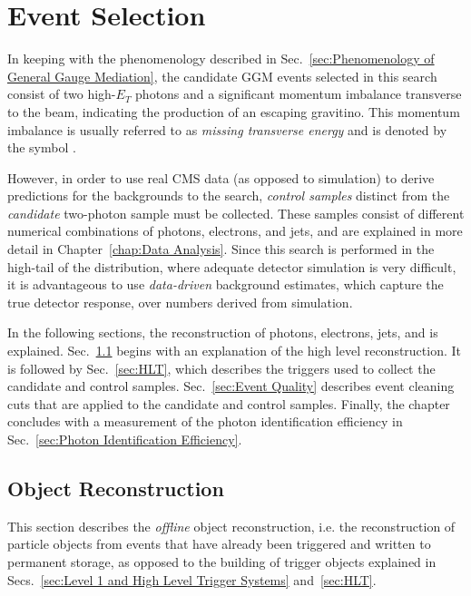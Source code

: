 \documentclass[dissertation.tex]{subfiles}
\begin{document}
\chapter{Event Selection}
\label{chap:Event Selection}

In keeping with the phenomenology described in Sec.~\ref{sec:Phenomenology of General Gauge Mediation}, the candidate GGM events selected in this search consist of two high-$E_{T}$ photons and a significant momentum imbalance transverse to the beam, indicating the production of an escaping gravitino.  This momentum imbalance is usually referred to as \textit{missing transverse energy} and is denoted by the symbol \MET.

However, in order to use real CMS data (as opposed to simulation) to derive predictions for the backgrounds to the search, \textit{control samples} distinct from the \textit{candidate} two-photon sample must be collected.  These samples consist of different numerical combinations of photons, electrons, and jets, and are explained in more detail in Chapter~\ref{chap:Data Analysis}.  Since this search is performed in the high-\MET tail of the \MET distribution, where adequate detector simulation is very difficult, it is advantageous to use \textit{data-driven} background estimates, which capture the true detector response, over numbers derived from simulation.

In the following sections, the reconstruction of photons, electrons, jets, and \MET is explained.  Sec.~\ref{sec:Object Reconstruction} begins with an explanation of the high level reconstruction.  It is followed by Sec.~\ref{sec:HLT}, which describes the triggers used to collect the candidate and control samples.  Sec.~\ref{sec:Event Quality} describes event cleaning cuts that are applied to the candidate and control samples.  Finally, the chapter concludes with a measurement of the photon identification efficiency in Sec.~\ref{sec:Photon Identification Efficiency}.

\section{Object Reconstruction}
\label{sec:Object Reconstruction}

This section describes the \textit{offline} object reconstruction, i.e. the reconstruction of particle objects from events that have already been triggered and written to permanent storage, as opposed to the building of trigger objects explained in Secs.~\ref{sec:Level 1 and High Level Trigger Systems} and~\ref{sec:HLT}.
\end{document}
